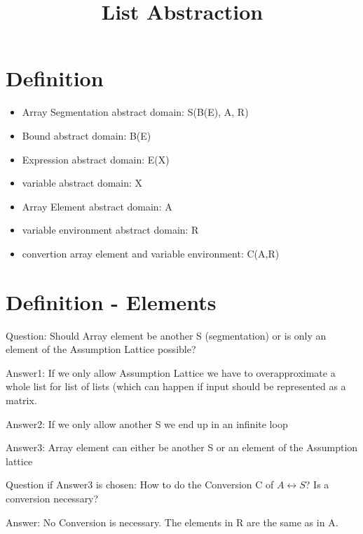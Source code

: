 \documentclass[11pt]{article}
\begin{document}
\title{List Abstraction}

\maketitle


\section{Definition}

\begin{itemize}
\item Array Segmentation abstract domain: S(B(E), A, R)
\item Bound abstract domain: B(E)
\item Expression abstract domain: E(X)
\item variable abstract domain: X
\item Array Element abstract domain: A
\item variable environment abstract domain: R
\item convertion array element and variable environment: C(A,R)
\end{itemize}

\section{Definition - Elements}

Question: Should Array element be another S (segmentation) or is only an element of the Assumption Lattice possible?

Answer1: If we only allow Assumption Lattice we have to overapproximate a whole list for list of lists (which can happen if input should be represented as a matrix.

Answer2: If we only allow another S we end up in an infinite loop

Answer3: Array element can either be another S or an element of the Assumption lattice

Question if Answer3 is chosen: How to do the Conversion C of $A \leftrightarrow S$? Is a conversion necessary?

Answer: No Conversion is necessary. The elements in R are the same as in A.
\end{document}
